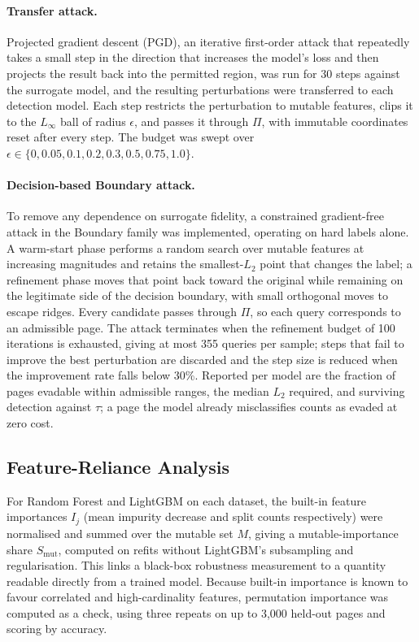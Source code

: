 \documentclass[runningheads]{llncs}
\begin{document}
\paragraph{Transfer attack.} Projected gradient descent (PGD), an iterative
first-order attack that repeatedly takes a small step in the direction that
increases the model's loss and then projects the result back into the permitted
region, was run for 30 steps against the surrogate model, and the resulting
perturbations were transferred to each detection model. Each step restricts the
perturbation to mutable features, clips it to the $L_\infty$ ball of radius
$\epsilon$, and passes it through $\Pi$, with immutable coordinates reset after
every step. The budget was swept over
$\epsilon \in \{0, 0.05, 0.1, 0.2, 0.3, 0.5, 0.75, 1.0\}$.

\paragraph{Decision-based Boundary attack.} To remove any dependence on surrogate
fidelity, a constrained gradient-free attack in the Boundary family
\cite{brendel2018} was implemented, operating on hard labels alone. A warm-start
phase performs a random search over mutable features at increasing magnitudes and
retains the smallest-$L_2$ point that changes the label; a refinement phase moves
that point back toward the original while remaining on the legitimate side of the
decision boundary, with small orthogonal moves to escape ridges. Every candidate
passes through $\Pi$, so each query corresponds to an admissible page. The attack
terminates when the refinement budget of 100 iterations is exhausted, giving at
most 355 queries per sample; steps that fail to improve the best perturbation are
discarded and the step size is reduced when the improvement rate falls below
30\%. Reported per model are the fraction of pages evadable within admissible
ranges, the median $L_2$ required, and surviving detection against $\tau$; a page
the model already misclassifies counts as evaded at zero cost.

\subsection{Feature-Reliance Analysis}
\label{sec:method-reliance}

For Random Forest and LightGBM on each dataset, the built-in feature importances
$I_j$ (mean impurity decrease and split counts respectively) were normalised and
summed over the mutable set $M$, giving a mutable-importance share
$S_{\mathrm{mut}}$, computed on refits without LightGBM's subsampling and
regularisation. This links a black-box robustness measurement to a quantity
readable directly from a trained model. Because built-in importance is
known to favour correlated and high-cardinality features, permutation importance
was computed as a check, using three repeats on up to 3,000 held-out pages and scoring by accuracy.
\end{document}
